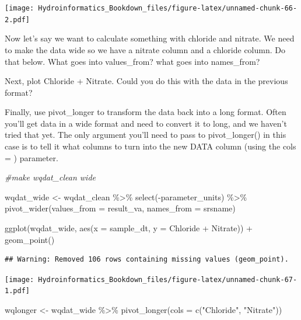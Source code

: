 \documentclass[
]{book}
\newenvironment{Shaded}{\begin{snugshade}}{\end{snugshade}}
\newcommand{\AttributeTok}[1]{\textcolor[rgb]{0.77,0.63,0.00}{#1}}
\newcommand{\CommentTok}[1]{\textcolor[rgb]{0.56,0.35,0.01}{\textit{#1}}}
\newcommand{\FunctionTok}[1]{\textcolor[rgb]{0.00,0.00,0.00}{#1}}
\newcommand{\NormalTok}[1]{#1}
\newcommand{\OtherTok}[1]{\textcolor[rgb]{0.56,0.35,0.01}{#1}}
\newcommand{\SpecialCharTok}[1]{\textcolor[rgb]{0.00,0.00,0.00}{#1}}
\newcommand{\StringTok}[1]{\textcolor[rgb]{0.31,0.60,0.02}{#1}}
\begin{document}
\texttt{[image: Hydroinformatics\_Bookdown\_files/figure-latex/unnamed-chunk-66-2.pdf]}

Now let's say we want to calculate something with chloride and nitrate. We need to make the data wide so we have a nitrate column and a chloride column. Do that below. What goes into values\_from? what goes into names\_from?

Next, plot Chloride + Nitrate. Could you do this with the data in the previous format?

Finally, use pivot\_longer to transform the data back into a long format. Often you'll get data in a wide format and need to convert it to long, and we haven't tried that yet. The only argument you'll need to pass to pivot\_longer() in this case is to tell it what columns to turn into the new DATA column (using the cols = ) parameter.

\begin{Shaded}
\begin{Highlighting}[]
\CommentTok{\#make wqdat\_clean wide}

\NormalTok{wqdat\_wide }\OtherTok{\textless{}{-}}\NormalTok{ wqdat\_clean }\SpecialCharTok{\%\textgreater{}\%} \FunctionTok{select}\NormalTok{(}\SpecialCharTok{{-}}\NormalTok{parameter\_units) }\SpecialCharTok{\%\textgreater{}\%}
  \FunctionTok{pivot\_wider}\NormalTok{(}\AttributeTok{values\_from =}\NormalTok{ result\_va, }\AttributeTok{names\_from =}\NormalTok{ srsname)}

\FunctionTok{ggplot}\NormalTok{(wqdat\_wide, }\FunctionTok{aes}\NormalTok{(}\AttributeTok{x =}\NormalTok{ sample\_dt, }\AttributeTok{y =}\NormalTok{ Chloride }\SpecialCharTok{+}\NormalTok{ Nitrate)) }\SpecialCharTok{+}
  \FunctionTok{geom\_point}\NormalTok{()}
\end{Highlighting}
\end{Shaded}

\begin{verbatim}
## Warning: Removed 106 rows containing missing values (geom_point).
\end{verbatim}

\texttt{[image: Hydroinformatics\_Bookdown\_files/figure-latex/unnamed-chunk-67-1.pdf]}

\begin{Shaded}
\begin{Highlighting}[]
\NormalTok{wqlonger }\OtherTok{\textless{}{-}}\NormalTok{ wqdat\_wide }\SpecialCharTok{\%\textgreater{}\%}
  \FunctionTok{pivot\_longer}\NormalTok{(}\AttributeTok{cols =} \FunctionTok{c}\NormalTok{(}\StringTok{"Chloride"}\NormalTok{, }\StringTok{"Nitrate"}\NormalTok{))}
\end{Highlighting}
\end{Shaded}
\end{document}
